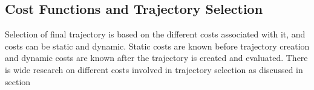 








\subsection{Cost Functions and Trajectory Selection} \label{traj_Selection}
Selection of final trajectory is based on the different costs associated with it, and costs can be static and dynamic. Static costs are known before trajectory creation and dynamic costs are known after the trajectory is created and evaluated. There is wide research on different costs involved in trajectory selection as discussed in section 

